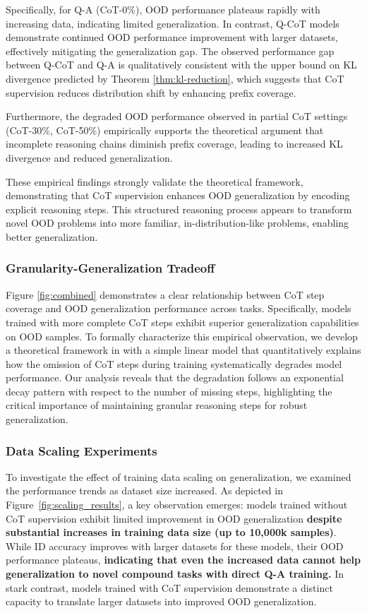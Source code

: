 Specifically, for Q-A (CoT-0\%), OOD performance plateaus rapidly with increasing data, indicating limited generalization. In contrast, Q-CoT models demonstrate continued OOD performance improvement with larger datasets, effectively mitigating the generalization gap.  The observed performance gap between Q-CoT and Q-A is qualitatively consistent with the upper bound on KL divergence predicted by Theorem \ref{thm:kl-reduction}, which suggests that CoT supervision reduces distribution shift by enhancing prefix coverage.

Furthermore, the degraded OOD performance observed in partial CoT settings (CoT-30\%, CoT-50\%) empirically supports the theoretical argument that incomplete reasoning chains diminish prefix coverage, leading to increased KL divergence and reduced generalization.

These empirical findings strongly validate the theoretical framework, demonstrating that CoT supervision enhances OOD generalization by encoding explicit reasoning steps. This structured reasoning process appears to transform novel OOD problems into more familiar, in-distribution-like problems, enabling better generalization.

\subsubsection{Granularity-Generalization Tradeoff}
Figure \ref{fig:combined} demonstrates a clear relationship between CoT step coverage and OOD generalization performance across tasks. Specifically, models trained with more complete CoT steps exhibit superior generalization capabilities on OOD samples. To formally characterize this empirical observation, we develop a theoretical framework in with a simple linear model that quantitatively explains how the omission of CoT steps during training systematically degrades model performance. Our analysis reveals that the degradation follows an exponential decay pattern with respect to the number of missing steps, highlighting the critical importance of maintaining granular reasoning steps for robust generalization. 

\subsubsection{Data Scaling Experiments}
To investigate the effect of training data scaling on generalization, we examined the performance trends as dataset size increased. As depicted in Figure~\ref{fig:scaling_results}, a key observation emerges: models trained without CoT supervision exhibit limited improvement in OOD generalization \textbf{despite substantial increases in training data size (up to 10,000k samples)}. While ID accuracy improves with larger datasets for these models, their OOD performance plateaus, \textbf{indicating that even the increased data cannot help generalization to novel compound tasks with direct Q-A training.} In stark contrast, models trained with CoT supervision demonstrate a distinct capacity to translate larger datasets into improved OOD generalization. 

